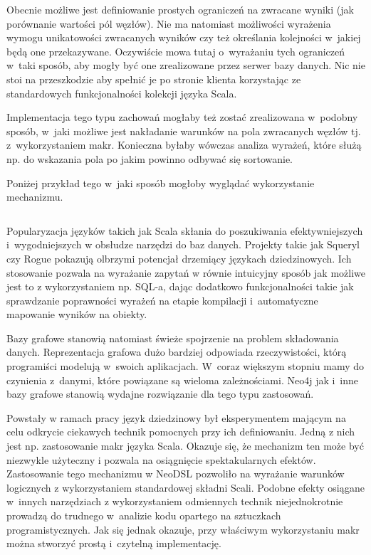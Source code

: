 \documentclass[brudnopis]{xmgr}
\begin{document}
Obecnie możliwe jest definiowanie prostych ograniczeń na zwracane wyniki (jak porównanie wartości pól węzłów). Nie ma natomiast możliwości wyrażenia wymogu unikatowości zwracanych wyników czy też określania kolejności w~jakiej będą one przekazywane. Oczywiście mowa tutaj o~wyrażaniu tych ograniczeń w~taki sposób, aby mogły być one zrealizowane przez serwer bazy danych. Nic nie stoi na przeszkodzie aby spełnić je po stronie klienta korzystając ze standardowych funkcjonalności kolekcji języka Scala.

Implementacja tego typu zachowań mogłaby też zostać zrealizowana w~podobny sposób, w~jaki możliwe jest nakładanie warunków na pola zwracanych węzłów tj. z~wykorzystaniem makr. Konieczna byłaby wówczas analiza wyrażeń, które służą np. do wskazania pola po jakim powinno odbywać się sortowanie. 

\medskip\noindent Poniżej przykład tego w~jaki sposób mogłoby wyglądać wykorzystanie mechanizmu.

\inputminted{scala}{listings/scala/missing-query-features.scala}

\summary

Popularyzacja języków takich jak Scala skłania do poszukiwania efektywniejszych i~wygodniejszych w obsłudze narzędzi do baz danych. Projekty takie jak Squeryl czy Rogue pokazują olbrzymi potencjał drzemiący językach dziedzinowych. Ich stosowanie pozwala na wyrażanie zapytań w równie intuicyjny sposób jak możliwe jest to z wykorzystaniem np. SQL-a, dając dodatkowo funkcjonalności takie jak sprawdzanie poprawności wyrażeń na etapie kompilacji i~automatyczne mapowanie wyników na obiekty.

Bazy grafowe stanowią natomiast świeże spojrzenie na problem składowania danych. Reprezentacja grafowa dużo bardziej odpowiada rzeczywistości, którą programiści modelują w~swoich aplikacjach. W~coraz większym stopniu mamy do czynienia z~danymi, które powiązane są wieloma zależnościami. Neo4j jak i~inne bazy grafowe stanowią wydajne rozwiązanie dla tego typu zastosowań.

Powstały w ramach pracy język dziedzinowy był eksperymentem mającym na celu odkrycie ciekawych technik pomocnych przy ich definiowaniu. Jedną z nich jest np. zastosowanie makr języka Scala. Okazuje się, że mechanizm ten może być niezwykle użyteczny i pozwala na osiągnięcie spektakularnych efektów. Zastosowanie tego mechanizmu w NeoDSL pozwoliło na wyrażanie warunków logicznych z wykorzystaniem standardowej składni Scali. Podobne efekty osiągane w~innych narzędziach z wykorzystaniem odmiennych technik niejednokrotnie prowadzą do trudnego w~analizie kodu opartego na sztuczkach programistycznych. Jak się jednak okazuje, przy właściwym wykorzystaniu makr można stworzyć prostą i~czytelną implementację.
\end{document}

